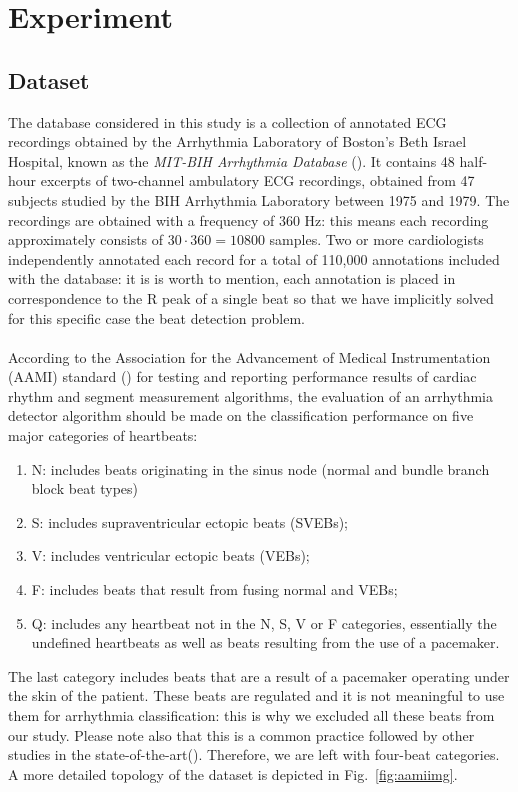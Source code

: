 \documentclass[LaM,binding=0.6cm]{sapthesis}
\begin{document}
\chapter{Experiment}

\section{Dataset}
The database considered in this study is a collection of annotated ECG recordings obtained by the Arrhythmia Laboratory of Boston's Beth Israel Hospital, known as the \textit{MIT-BIH Arrhythmia Database} (\cite{dbmitbih}). It contains 48 half-hour excerpts of two-channel ambulatory ECG recordings, obtained from 47 subjects studied by the BIH Arrhythmia Laboratory between 1975 and 1979. The recordings are obtained with a frequency of 360 Hz: this means each recording approximately consists of $30\cdot360=10800$ samples. Two or more cardiologists independently annotated each record for a total of 110,000 annotations included with the database: it is is worth to mention, each annotation is placed in correspondence to the R peak of a single beat so that we have implicitly solved for this specific case the beat detection problem.\\\\According to the Association for the Advancement of Medical Instrumentation (AAMI) standard (\cite{aamistd}) for testing and reporting performance results of cardiac rhythm and segment measurement algorithms, the evaluation of an arrhythmia detector algorithm should be made on the classification performance on five major categories of heartbeats:
\begin{enumerate}
\item N: includes beats originating in the sinus node (normal and bundle branch block beat types)
\item S: includes supraventricular ectopic beats (SVEBs);
\item V: includes ventricular ectopic beats (VEBs);
\item F: includes beats that result from fusing normal and VEBs;
\item Q: includes any heartbeat not in the N, S, V or F categories, essentially the undefined heartbeats as well as beats resulting from the use of a pacemaker.
\end{enumerate}
The last category includes beats that are a result of a pacemaker operating under the skin of the patient. These beats are regulated and it is not meaningful to use them for arrhythmia classification: this is why we excluded all these beats from our study. Please note also that this is a common practice followed by other studies in the state-of-the-art(\cite{fog}). Therefore, we are left with four-beat categories. A more detailed topology of the dataset is depicted in Fig.~\ref{fig:aamiimg}.
\end{document}
